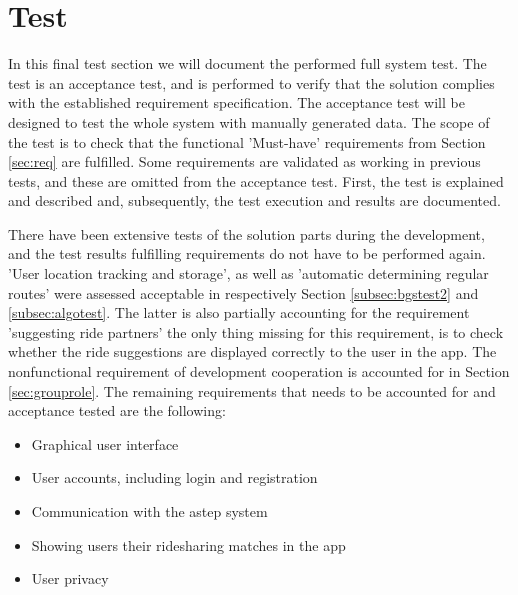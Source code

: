 \section{Test}\label{sec:s4test}
In this final test section we will document the performed full system test.
The test is an acceptance test, and is performed to verify that the solution complies with the established requirement specification.
The acceptance test will be designed to test the whole system with manually generated data.
The scope of the test is to check that the functional 'Must-have' requirements from Section \ref{sec:req} are fulfilled.
Some requirements are validated as working in previous tests, and these are omitted from the acceptance test. 
First, the test is explained and described and, subsequently, the test execution and results are documented.


There have been extensive tests of the solution parts during the development, and the test results fulfilling requirements do not have to be performed again.
'User location tracking and storage', as well as 'automatic determining regular routes' were assessed acceptable in respectively Section \ref{subsec:bgstest2} and \ref{subsec:algotest}.
The latter is also partially accounting for the requirement 'suggesting ride partners' the only thing missing for this requirement, is to check whether the ride suggestions are displayed correctly to the user in the app. 
The nonfunctional requirement of development cooperation is accounted for in Section \ref{sec:grouprole}. 
The remaining requirements that needs to be accounted for and acceptance tested are the following:
\begin{itemize}
	\item Graphical user interface
	\item User accounts, including login and registration
	\item Communication with the \gls{astep} system
	\item Showing users their ridesharing matches in the app
	\item User privacy
\end{itemize}

